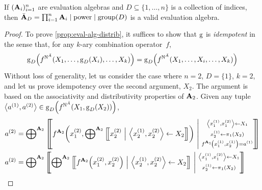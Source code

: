 \begin{lemma}[Validity]
    If \((\mathbf{A}_i)_{i=1}^n\) are evaluation algebras and \(D \subseteq \{1, \ldots, n\}\) is a collection of indices, then \(\bar{\mathbf{A}}_D = \prod_{i=1}^n\mathbf{A}_i \mid \mathrm{power} \mid \mathrm{group}(D)\) is a valid evaluation algebra.
\end{lemma}
\begin{proof}
    To prove \cref{prop:eval-alg-distrib}, it suffices to show that \(\operatorname{g}\) is \emph{idempotent} in the sense that, for any \(k\)-ary combination operator~\(f\),
    \begin{align*}
        \operatorname{g}_D\!\left(f^{\mathbb{N}^{\bar A}}(X_1, \ldots, \operatorname{g}_D(X_i), \ldots, X_k)\right)
        = \operatorname{g}_D\!\left(f^{\mathbb{N}^{\bar A}}(X_1, \ldots, X_i, \ldots, X_k)\right)
    \end{align*}
    Without loss of generality, let us consider the case where \(n = 2\), \(D = \{1\}\), \(k = 2\), and let us prove idempotency over the second argument, \(X_2\).
    The argument is based on the associativity and distributivity properties of \(\mathbf{A}_2\).
    Given any tuple \(\left\langle a^{(1)}, a^{(2)}\right\rangle \in \operatorname{g}_D\!\left(f^{\mathbb{N}^{\bar A}}(X_1, \operatorname{g}_D(X_2))\right)\),
    \begin{align*}
        a^{(2)} &= {\algsum}^{\alg_2}\verybigmset{
            f^{\alg_2}\!\left(x_1^{(2)}, {\algsum}^{\alg_2}\bigmset{
                x_2^{(2)}
                \ \middle|
                \ \tup{x_2^{(1)}, x_2^{(2)}}
                \gets X_2
            }\right)
            \ \middle|
            \ \substack{
                \tup{x_1^{(1)}, x_1^{(2)}} \gets X_1\\[.5ex]
                x_2^{(1)} \gets \proj_1(X_2)\\[.5ex]
                f^{\alg_1}\!\left(x_1^{(1)}, x_2^{(1)}\right) = a^{(1)}
            }
        } \\
        a^{(2)} &= {\algsum}^{\alg_2}\verybigmset{
            {\algsum}^{\alg_2}\bigmset{
                f^{\alg_2}\!\left(x_1^{(2)}, x_2^{(2)}\right)
                \ \middle|
                \ \tup{x_2^{(1)}, x_2^{(2)}}
                \gets X_2
            }
            \ \middle|
            \ \substack{
                \tup{x_1^{(1)}, x_1^{(2)}} \gets X_1\\[.5ex]
                x_2^{(1)} \gets \proj_1(X_2)\\[.5ex]
}}
\end{align*}
\end{proof}
